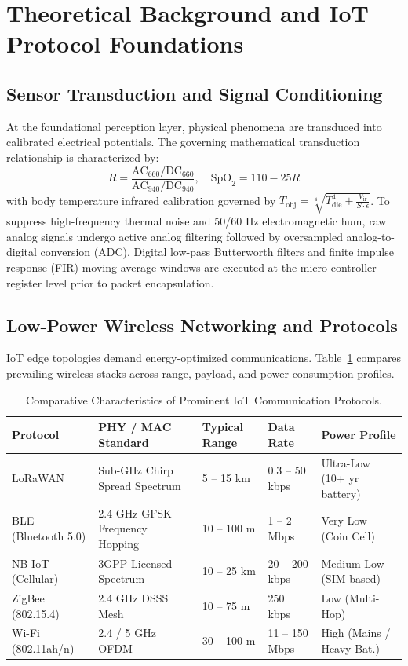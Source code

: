 \section{Theoretical Background and IoT Protocol Foundations}

\subsection{Sensor Transduction and Signal Conditioning}
At the foundational perception layer, physical phenomena are transduced into calibrated electrical potentials. The governing mathematical transduction relationship is characterized by:
\begin{equation}
  R = \frac{\text{AC}_{660}/\text{DC}_{660}}{\text{AC}_{940}/\text{DC}_{940}}, \quad \text{SpO}_2 = 110 - 25 R
\label{eq:core_math}
\end{equation}
with body temperature infrared calibration governed by $T_{\text{obj}} = \sqrt[4]{T_{\text{die}}^4 + \frac{V_{\text{ir}}}{S \cdot \epsilon}}$.
To suppress high-frequency thermal noise and 50/60 Hz electromagnetic hum, raw analog signals undergo active analog filtering followed by oversampled analog-to-digital conversion (ADC). Digital low-pass Butterworth filters and finite impulse response (FIR) moving-average windows are executed at the micro-controller register level prior to packet encapsulation.

\subsection{Low-Power Wireless Networking and Protocols}
IoT edge topologies demand energy-optimized communications. Table~\ref{tab:proto_comp} compares prevailing wireless stacks across range, payload, and power consumption profiles.
\begin{table}[H]
\centering
\caption{Comparative Characteristics of Prominent IoT Communication Protocols.}
\label{tab:proto_comp}
\begin{tabularx}{\linewidth}{lXXXX}
\toprule
\textbf{Protocol} & \textbf{PHY / MAC Standard} & \textbf{Typical Range} & \textbf{Data Rate} & \textbf{Power Profile} \\
\midrule
LoRaWAN & Sub-GHz Chirp Spread Spectrum & 5 -- 15 km & 0.3 -- 50 kbps & Ultra-Low (10+ yr battery) \\
BLE (Bluetooth 5.0) & 2.4 GHz GFSK Frequency Hopping & 10 -- 100 m & 1 -- 2 Mbps & Very Low (Coin Cell) \\
NB-IoT (Cellular) & 3GPP Licensed Spectrum & 10 -- 25 km & 20 -- 200 kbps & Medium-Low (SIM-based) \\
ZigBee (802.15.4) & 2.4 GHz DSSS Mesh & 10 -- 75 m & 250 kbps & Low (Multi-Hop) \\
Wi-Fi (802.11ah/n) & 2.4 / 5 GHz OFDM & 30 -- 100 m & 11 -- 150 Mbps & High (Mains / Heavy Bat.) \\
\bottomrule
\end{tabularx}
\end{table}

